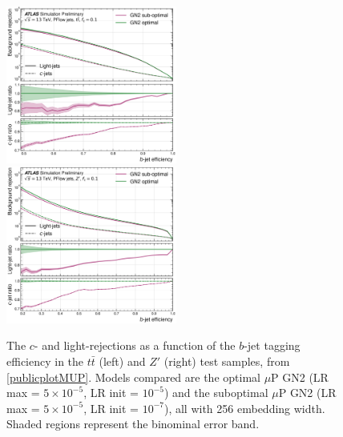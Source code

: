 \begin{center}
  \begin{figure}[h!]
  \centerline{
  \includegraphics[width=0.50\textwidth]{Images/FTAG/GN/HPO/thesis_roc/roc_ttbar.png}
  \includegraphics[width=0.50\textwidth]{Images/FTAG/GN/HPO/thesis_roc/roc_zp.png}
  }
  \caption{The $c$- and light-rejections as a function of the $b$-jet tagging efficiency in the $t\bar{t}$ (left) and $Z'$ (right) test samples, from \ref{publicplotMUP}. Models compared are the optimal $\mu$P GN2 (LR max = $5\times 10^{-5}$, LR init = $10^{-5}$) and the suboptimal $\mu$P GN2 (LR max = $5 \times 10^{-5}$, LR init = $10^{-7}$), all with 256 embedding width. Shaded regions represent the binominal error band.}
  \label{fig:rocmupGN2}
  \end{figure}
\end{center}

